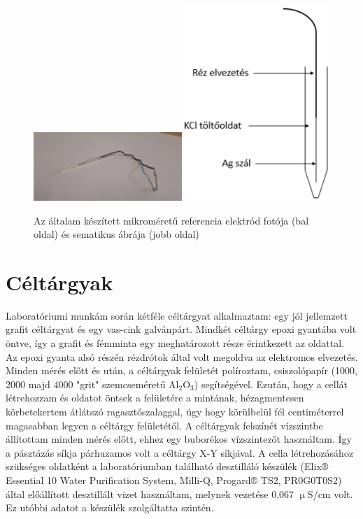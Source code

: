 \begin{figure}
\centering
\includegraphics[width=0.5\textwidth]{img/electrode.eps}\includegraphics[width=0.5\textwidth]{img/electrode1.eps}
\caption{Az általam készített mikroméretű referencia elektród fotója (bal oldal) és sematikus ábrája (jobb oldal)}
\label{fig:electrode}
\end{figure}

\section{Céltárgyak}

Laboratóriumi munkám során kétféle céltárgyat alkalmaztam: egy jól jellemzett grafit céltárgyat és egy vas-cink galvánpárt. Mindkét céltárgy epoxi gyantába volt öntve, így a grafit és fémminta egy meghatározott része érintkezett az oldattal. Az epoxi gyanta alsó részén rézdrótok által volt megoldva az elektromos elvezetés. Minden mérés előtt és után, a céltárgyak felületét políroztam, csiszolópapír (1000, 2000 majd 4000 "grit" szemcseméretű Al$_2$O$_3$) segítségével. Ezután, hogy a cellát létrehozzam és oldatot öntsek a felületére a mintának, hézagmentesen körbetekertem átlátszó ragasztószalaggal, úgy hogy körülbelül fél centiméterrel magasabban legyen a céltárgy felületétől. A céltárgyak felszínét vízszintbe állítottam minden mérés előtt, ehhez egy buborékos vízszintezőt használtam. Így a pásztázás síkja párhuzamos volt a céltárgy X-Y síkjával. A cella létrehozásához szükséges oldatként a laboratóriumban található desztilláló készülék (Elix® Essential 10 Water Purification System, Milli-Q, Progard® TS2, PR0G0T0S2) által előállított desztillált vizet használtam, melynek vezetése 0,067 $\upmu$S/cm volt. Ez utóbbi adatot a készülék szolgáltatta szintén. 

